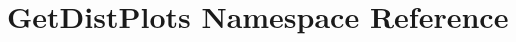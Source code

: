 \hypertarget{namespaceGetDistPlots}{}\section{Get\+Dist\+Plots Namespace Reference}
\label{namespaceGetDistPlots}
